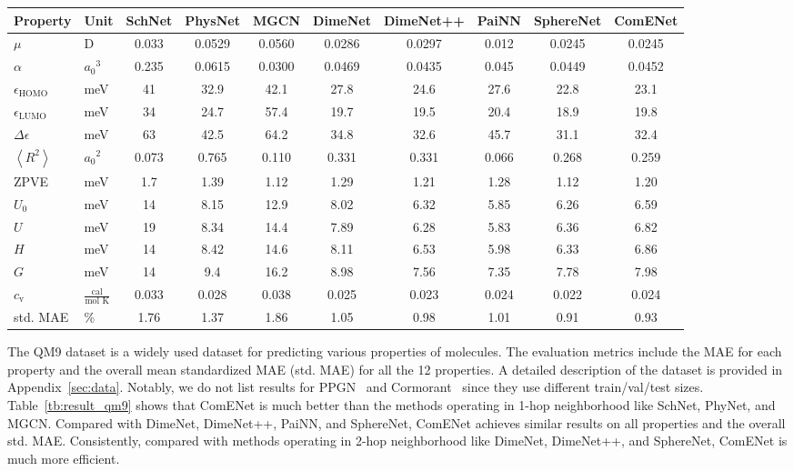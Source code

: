 \documentclass{article}
\begin{document}
\begin{table*}[t]
\begin{center}
\caption{Comparisons between ComENet and other models
    in terms of MAE and the overall mean std. MAE on QM9.
}\label{tb:result_qm9}
\resizebox{\textwidth}{!}
{\begin{tabular}{llcccccccc}
\toprule
Property &Unit &SchNet &PhysNet &MGCN &DimeNet &DimeNet++ &PaiNN &SphereNet &ComENet \\
\midrule
$\mu$                  &D      &0.033 &0.0529 &0.0560 &0.0286 &0.0297 &0.012 &0.0245 & 0.0245\\
$\alpha$            &${a_0}^3$ &0.235 &0.0615 &0.0300 &0.0469 &0.0435 &0.045 &0.0449 & 0.0452\\
$\epsilon_\text{HOMO}$ &meV    &41    &32.9   &42.1   &27.8   &24.6   &27.6   &22.8  & 23.1\\
$\epsilon_\text{LUMO}$ &meV    &34    &24.7   &57.4   &19.7   &19.5   &20.4   &18.9  & 19.8\\
$\Delta\epsilon$       &meV    &63    &42.5   &64.2   &34.8   &32.6   &45.7   &31.1  & 32.4\\
$\left< R^2 \right>$ &${a_0}^2$ &0.073 &0.765  &0.110  &0.331  &0.331  &0.066  &0.268 & 0.259\\
ZPVE  &meV    &1.7   &1.39   &1.12   &1.29   &1.21   &1.28   &1.12  & 1.20\\
$U_0$    &meV    &14    &8.15   &12.9   &8.02   &6.32   &5.85   &6.26  & 6.59\\
$U$     &meV    &19    &8.34   &14.4   &7.89   &6.28   &5.83   &6.36  & 6.82\\
$H$     &meV    &14    &8.42   &14.6   &8.11   &6.53   &5.98   &6.33  & 6.86\\
$G$     &meV    &14    &9.4    &16.2   &8.98   &7.56   &7.35   &7.78  & 7.98\\
$c_\text{v}$ &$\frac{\mbox{cal}}{\mbox{mol K}}$ &0.033 &0.028  &0.038  &0.025  &0.023  &0.024  &0.022 & 0.024\\
\midrule
std. MAE &\%  &1.76  &1.37   &1.86   &1.05   &0.98   &1.01   &0.91  &0.93 \\
\bottomrule
\end{tabular}}
\end{center}
\vspace{-10 pt}
\end{table*}

The QM9 dataset is a widely used dataset for predicting various properties of molecules. 
The evaluation metrics include the MAE for each property and the overall mean standardized MAE (std. MAE) for all the 12 properties. A detailed description of the dataset is provided in Appendix~\ref{sec:data}.
Notably, we do not list results for PPGN~\cite{maron2019provably} and Cormorant~\cite{anderson2019cormorant} since they use different train/val/test sizes. 
Table~\ref{tb:result_qm9} shows that ComENet 
is much better than the methods operating in 1-hop neighborhood like SchNet, PhyNet, and MGCN.
Compared with DimeNet, DimeNet++, PaiNN, and SphereNet,
ComENet achieves similar results on all properties
and the overall std. MAE.
Consistently, compared with methods operating in 2-hop neighborhood
like DimeNet, DimeNet++, and SphereNet, ComENet is much more efficient.
\end{document}
